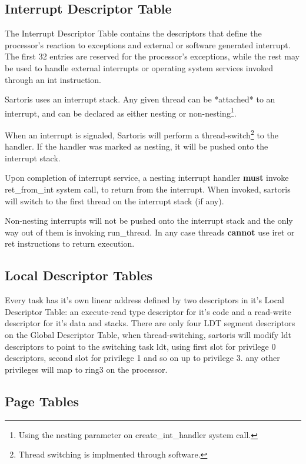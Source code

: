 \documentclass[11pt, letterpaper, twoside, english]{book}
\begin{document}
\subsection{Interrupt Descriptor Table}

The Interrupt Descriptor Table contains the descriptors that define the processor's reaction to exceptions and external or software generated interrupt. The first 32 entries are reserved for the processor's exceptions, while the rest may be used to handle external interrupts or operating system services invoked through an \textsf{int} instruction. 

Sartoris uses an interrupt stack. Any given thread can be *attached* to an interrupt, and can be declared as either nesting or non-nesting\footnote{Using the \textsf{nesting} parameter on \textsf{create\_int\_handler} system call.}. 

When an interrupt is signaled, Sartoris will perform a thread-switch\footnote{Thread switching is implmented through software.} to the handler. If the handler was marked as nesting, it will be pushed onto the interrupt stack.

Upon completion of interrupt service, a \textsf{nesting} interrupt handler \textbf{must} invoke \textsf{ret\_from\_int} system call, to return from the interrupt. When invoked, sartoris will switch to the first thread on the interrupt stack (if any).

Non-nesting interrupts will not be pushed onto the interrupt stack and the only way out of them is invoking \textsf{run\_thread}. In any case threads \textbf{cannot} use \textsf{iret} or \textsf{ret} instructions to return execution.

\subsection{Local Descriptor Tables}

Every task has it's own linear address defined by two descriptors in it's Local Descriptor Table: an execute-read type descriptor for it's code and a read-write descriptor for it's data and stacks. There are only four LDT segment descriptors on the Global Descriptor Table, when thread-switching, sartoris will modify ldt descriptors to point to the switching task ldt, using first slot for privilege 0 descriptors, second slot for privilege 1 and so on up to privilege 3. any other privileges will map to ring3 on the processor.

\subsection{Page Tables}
\end{document}
